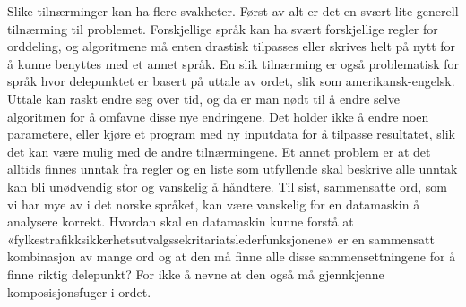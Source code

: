 Slike tilnærminger kan ha flere svakheter. Først av alt er det en svært lite generell tilnærming til problemet. Forskjellige språk kan ha svært forskjellige regler for orddeling, og algoritmene må enten drastisk tilpasses eller skrives helt på nytt for å kunne benyttes med et annet språk. En slik tilnærming er også problematisk for språk hvor delepunktet er basert på uttale av ordet, slik som amerikansk-engelsk. Uttale kan raskt endre seg over tid, og da er man nødt til å endre selve algoritmen for å omfavne disse nye endringene. Det holder ikke å endre noen parametere, eller kjøre et program med ny inputdata for å tilpasse resultatet, slik det kan være mulig med de andre tilnærmingene. Et annet problem er at det alltids finnes unntak fra regler og en liste som utfyllende skal beskrive alle unntak kan bli unødvendig stor og vanskelig å håndtere. Til sist, sammensatte ord, som vi har mye av i det norske språket, kan være vanskelig for en datamaskin å analysere korrekt. Hvordan skal en datamaskin kunne forstå at «fylkestrafikksikkerhetsutvalgssekritariatslederfunksjonene» er en sammensatt kombinasjon av mange ord og at den må finne alle disse sammensettningene for å finne riktig delepunkt? For ikke å nevne at den også må gjennkjenne komposisjonsfuger i ordet. \cite{liang1983word,thoresen1993virtuelle}